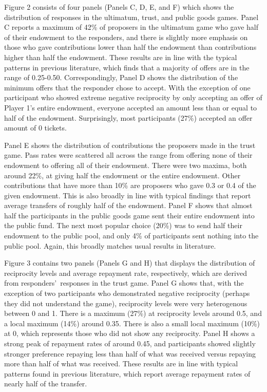 \documentclass[12pt]{article}
\begin{document}
Figure 2 consists of four panels (Panels C, D, E, and F) which shows the distribution of responses in the ultimatum, trust, and public goods games. Panel C reports a maximum of 42\% of proposers in the ultimatum game who gave half of their endowment to the responders, and there is slightly more emphasis on those who gave contributions lower than half the endowment than contributions higher than half the endowment. These results are in line with the typical patterns in previous literature, which finds that a majority of offers are in the range of 0.25-0.50. Correspondingly, Panel D shows the distribution of the minimum offers that the responder chose to accept. With the exception of one participant who showed extreme negative reciprocity by only accepting an offer of Player 1's entire endowment, everyone accepted an amount less than or equal to half of the endowment. Surprisingly, most participants (27\%) accepted an offer amount of 0 tickets. 

Panel E shows the distribution of contributions the proposers made in the trust game. Pass rates were scattered all across the range from offering none of their endowment to offering all of their endowment. There were two maxima, both around 22\%, at giving half the endowment or the entire endowment. Other contributions that have more than 10\% are proposers who gave 0.3 or 0.4 of the given endowment. This is also broadly in line with typical findings that report average transfers of roughly half of the endowment. Panel F shows that almost half the participants in the public goods game sent their entire endowment into the public fund. The next most popular choice (20\%) was to send half their endowment to the public pool, and only 4\% of participants sent nothing into the public pool. Again, this broadly matches usual results in literature.

Figure 3 contains two panels (Panels G and H) that displays the distribution of reciprocity levels and average repayment rate, respectively, which are derived from responders\rq \ responses in the trust game. Panel G shows that, with the exception of two participants who demonstrated negative reciprocity (perhaps they did not understand the game), reciprocity levels were very heterogenous between 0 and 1. There is a maximum (27\%) at reciprocity levels around 0.5, and a local maximum (14\%) around 0.35. There is also a small local maximum (10\%) at 0, which represents those who did not show any reciprocity. Panel H shows a strong peak of repayment rates of around 0.45, and participants showed slightly stronger preference repaying less than half of what was received versus repaying more than half of what was received. These results are in line with typical patterns found in previous literature, which report average repayment rates of nearly half of the transfer.
\end{document}
